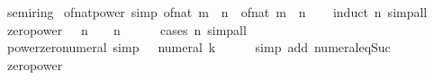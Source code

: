 \begin{isabellebody}
\endisatagproof
{\isafoldproof}%
%
\isadelimproof
\isanewline
%
\endisadelimproof
\isanewline
{}\isamarkupfalse%
\isanewline
\isanewline
{}\isamarkupfalse%
\ semiring{\isacharunderscore}{\kern0pt}{}\isanewline
{}\isanewline
\isanewline
{}\isamarkupfalse%
\ of{\isacharunderscore}{\kern0pt}nat{\isacharunderscore}{\kern0pt}power\ {\isacharbrackleft}{\kern0pt}simp{\isacharbrackright}{\kern0pt}{\isacharcolon}{\kern0pt}\ {\isachardoublequoteopen}of{\isacharunderscore}{\kern0pt}nat\ {\isacharparenleft}{\kern0pt}m\ {\isacharcircum}{\kern0pt}\ n{\isacharparenright}{\kern0pt}\ {\isacharequal}{\kern0pt}\ of{\isacharunderscore}{\kern0pt}nat\ m\ {\isacharcircum}{\kern0pt}\ n{\isachardoublequoteclose}\isanewline
%
\isadelimproof
\ \ %
\endisadelimproof
%
\isatagproof
{}\isamarkupfalse%
\ {\isacharparenleft}{\kern0pt}induct\ n{\isacharparenright}{\kern0pt}\ simp{\isacharunderscore}{\kern0pt}all%
\endisatagproof
{\isafoldproof}%
%
\isadelimproof
\isanewline
%
\endisadelimproof
\isanewline
{}\isamarkupfalse%
\ zero{\isacharunderscore}{\kern0pt}power{\isacharcolon}{\kern0pt}\ {\isachardoublequoteopen}{}\ {\isacharless}{\kern0pt}\ n\ {\isasymLongrightarrow}\ {}\ {\isacharcircum}{\kern0pt}\ n\ {\isacharequal}{\kern0pt}\ {}{\isachardoublequoteclose}\isanewline
%
\isadelimproof
\ \ %
\endisadelimproof
%
\isatagproof
{}\isamarkupfalse%
\ {\isacharparenleft}{\kern0pt}cases\ n{\isacharparenright}{\kern0pt}\ simp{\isacharunderscore}{\kern0pt}all%
\endisatagproof
{\isafoldproof}%
%
\isadelimproof
\isanewline
%
\endisadelimproof
\isanewline
{}\isamarkupfalse%
\ power{\isacharunderscore}{\kern0pt}zero{\isacharunderscore}{\kern0pt}numeral\ {\isacharbrackleft}{\kern0pt}simp{\isacharbrackright}{\kern0pt}{\isacharcolon}{\kern0pt}\ {\isachardoublequoteopen}{}\ {\isacharcircum}{\kern0pt}\ numeral\ k\ {\isacharequal}{\kern0pt}\ {}{\isachardoublequoteclose}\isanewline
%
\isadelimproof
\ \ %
\endisadelimproof
%
\isatagproof
{}\isamarkupfalse%
\ {\isacharparenleft}{\kern0pt}simp\ add{\isacharcolon}{\kern0pt}\ numeral{\isacharunderscore}{\kern0pt}eq{\isacharunderscore}{\kern0pt}Suc{\isacharparenright}{\kern0pt}%
\endisatagproof
{\isafoldproof}%
%
\isadelimproof
\isanewline
%
\endisadelimproof
\isanewline
{}\isamarkupfalse%
\ zero{\isacharunderscore}{\kern0pt}power{}{\isacharcolon}{\kern0pt}\ {\isachardoublequoteopen}{}\ {\isacharequal}{\kern0pt}\ {}{\isachardoublequoteclose}\ \isanewline

\end{isabellebody}
